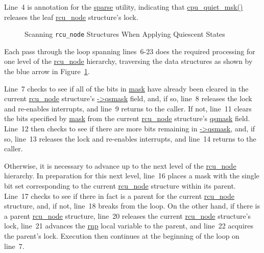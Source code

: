 Line~4 is annotation for the \url{sparse} utility, indicating
that \url{cpu_quiet_msk()} releases the leaf \url{rcu_node}
structure's lock.

\begin{figure}[tb]
\begin{center}
\end{center}
\caption{Scanning {\tt rcu\_node} Structures When Applying Quiescent States}
\label{fig:app:rcuimpl:rcutree:Scanning rcu-node Structures When Applying Quiescent States}
\end{figure}

Each pass through the loop spanning lines~6-23 does the required
processing for one level of the \url{rcu_node} hierarchy, traversing
the data structures as shown by the blue arrow in
Figure~\ref{fig:app:rcuimpl:rcutree:Scanning rcu-node Structures When Applying Quiescent States}.

Line~7 checks to see if all of the bits in \url{mask} have already
been cleared in the current \url{rcu_node} structure's \url{->qsmask}
field, and, if so, line~8 releases the lock and re-enables interrupts,
and line~9 returns to the caller.
If not, line~11 clears the bits specified by \url{mask} from the current
\url{rcu_node} structure's \url{qsmask} field.
Line~12 then checks to see if there are more bits remaining
in \url{->qsmask}, and, if so, line~13 releases the lock and re-enables
interrupts, and line~14 returns to the caller.

Otherwise, it is necessary to advance up to the next level of the
\url{rcu_node} hierarchy.
In preparation for this next level, line~16 places a mask with the
single bit set corresponding to the current \url{rcu_node} structure within
its parent.
Line~17 checks to see if there in fact is a parent for the current
\url{rcu_node} structure, and, if not, line~18 breaks from the
loop.
On the other hand, if there is a parent \url{rcu_node} structure,
line~20 releases the current \url{rcu_node} structure's lock,
line~21 advances the \url{rnp} local variable to the parent,
and line~22 acquires the parent's lock.
Execution then continues at the beginning of the loop on line~7.

